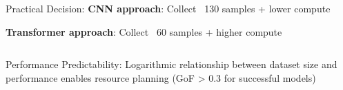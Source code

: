 \documentclass[aspectratio=43]{beamer}
\begin{document}
\begin{frame}
\begin{columns}
\begin{column}{0.4\textwidth}
            \begin{alertblock}{Practical Decision:}
                \scriptsize
                \textbf{CNN approach}: 
                Collect ~130 samples + lower compute
                
                \textbf{Transformer approach}: 
                Collect ~60 samples + higher compute
            \end{alertblock}
        \end{column}
    \end{columns}
    
    \begin{block}{Performance Predictability:}
        \small Logarithmic relationship between dataset size and performance enables resource planning (GoF > 0.3 for successful models)
    \end{block}
\end{frame}
\end{document}

